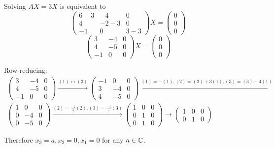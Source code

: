 \documentclass[a4paper, 10pt]{article}
\begin{document}
\begin{solution}
    Solving \(AX = 3X\) is equivalent to \[
        \begin{pmatrix}
                6 -3 & -4    & 0    \\
                4    & -2 -3 & 0    \\
                -1   & 0     & 3 -3
            \end{pmatrix} X = \begin{pmatrix}
                0 \\ 0 \\ 0
            \end{pmatrix}
    \]
    \[
        \begin{pmatrix}
                3  & -4 & 0 \\
                4  & -5 & 0 \\
                -1 & 0  & 0
            \end{pmatrix} X = \begin{pmatrix}
                0 \\ 0 \\ 0
            \end{pmatrix}
    \]

    Row-reducing:
    \begin{multline*}
        \begin{pmatrix}
                3  & -4 & 0 \\
                4  & -5 & 0 \\
                -1 & 0  & 0
            \end{pmatrix} \xrightarrow{(1) \leftrightarrow (3)}
        \begin{pmatrix}
                -1 & 0  & 0 \\
                3  & -4 & 0 \\
                4  & -5 & 0
            \end{pmatrix} \xrightarrow{(1) = -(1), (2) = (2) + 3(1), (3) = (3) + 4(1)}
        \\
        \begin{pmatrix}
                1 & 0  & 0 \\
                0 & -4 & 0 \\
                0 & -5 & 0
            \end{pmatrix} \xrightarrow{(2) = \frac{-1}{4}(2), (3) = \frac{-1}{5}(3)}
        \begin{pmatrix}
                1 & 0 & 0 \\
                0 & 1 & 0 \\
                0 & 1 & 0
            \end{pmatrix} \xrightarrow{}
        \begin{pmatrix}
        1 & 0 & 0 \\
        0 & 1 & 0 
        \end{pmatrix}
    \end{multline*}

    Therefore \(x_3 = a, x_2 = 0, x_1 = 0\) for any \(a \in \mathbb{C}\).
\end{solution}
\end{document}
